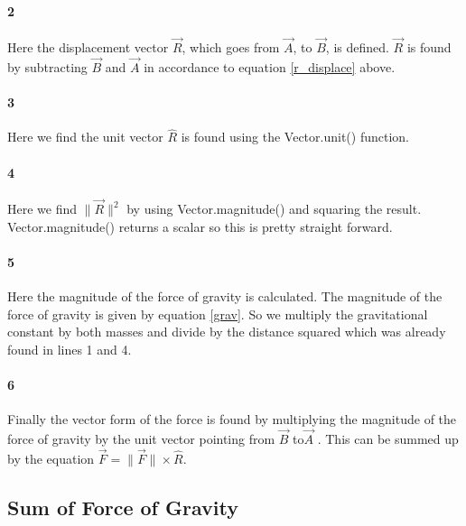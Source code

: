 \documentclass[15pt]{report}
\begin{document}
\paragraph{2} Here the displacement vector $\vec{R}$, which goes from $\vec{A}$, to $\vec{B}$, is defined. $\vec{R}$ is found by  subtracting $\vec{B}$ and $\vec{A}$ in accordance to equation \ref{r_displace} above.
\paragraph{3} Here we find the unit vector $\hat{R}$ is found using the Vector.unit() function.
\paragraph{4} Here we find $\| \vec{R} \| ^2$ by using Vector.magnitude() and squaring the result. Vector.magnitude() returns a scalar so this is pretty straight forward.
\paragraph{5} Here the magnitude of the force of gravity is calculated. The magnitude of the force of gravity is given by equation \ref{grav}. So we multiply the gravitational constant by both masses and divide by the distance squared which was already found in lines 1 and 4.
\paragraph{6} Finally the vector form of the force is found by multiplying the magnitude of the force of gravity by the unit vector pointing from $\vec{B}$ to$\vec{A}$ . This can be summed up by the equation $\vec{F} = \|\vec{F}\| \times \hat{R}$.
\subsection{Sum of Force of Gravity}
\printbibliography
\end{document}
